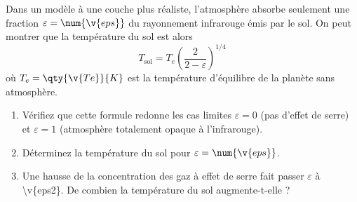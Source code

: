 Dans un modèle à une couche plus réaliste, l'atmosphère absorbe seulement une fraction $\varepsilon = \num{\v{eps}}$ du rayonnement infrarouge émis par le sol. On peut montrer que la température du sol est alors
\[ T_{\text{sol}} = T_e\left(\frac{2}{2 - \varepsilon}\right)^{1/4} \]
où $T_e = \qty{\v{Te}}{K}$ est la température d'équilibre de la planète sans atmosphère.

\begin{enumerate}[label=\alph*)]
    \item Vérifiez que cette formule redonne les cas limites $\varepsilon = 0$ (pas d'effet de serre) et $\varepsilon = 1$ (atmosphère totalement opaque à l'infrarouge).
    \item Déterminez la température du sol pour $\varepsilon = \num{\v{eps}}$.
    \item Une hausse de la concentration des gaz à effet de serre fait passer $\varepsilon$ à \num{\v{eps2}}. De combien la température du sol augmente-t-elle ?
\end{enumerate}
